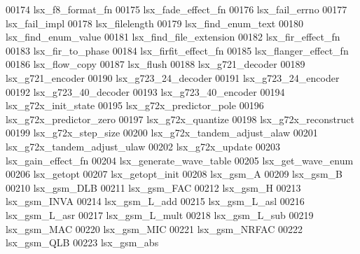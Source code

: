 \begin{DoxyCode}
00174 \textcolor{stringliteral}{lsx\_f8\_format\_fn}
00175 \textcolor{stringliteral}{lsx\_fade\_effect\_fn}
00176 \textcolor{stringliteral}{lsx\_fail\_errno}
00177 \textcolor{stringliteral}{lsx\_fail\_impl}
00178 \textcolor{stringliteral}{lsx\_filelength}
00179 \textcolor{stringliteral}{lsx\_find\_enum\_text}
00180 \textcolor{stringliteral}{lsx\_find\_enum\_value}
00181 \textcolor{stringliteral}{lsx\_find\_file\_extension}
00182 \textcolor{stringliteral}{lsx\_fir\_effect\_fn}
00183 \textcolor{stringliteral}{lsx\_fir\_to\_phase}
00184 \textcolor{stringliteral}{lsx\_firfit\_effect\_fn}
00185 \textcolor{stringliteral}{lsx\_flanger\_effect\_fn}
00186 \textcolor{stringliteral}{lsx\_flow\_copy}
00187 \textcolor{stringliteral}{lsx\_flush}
00188 \textcolor{stringliteral}{lsx\_g721\_decoder}
00189 \textcolor{stringliteral}{lsx\_g721\_encoder}
00190 \textcolor{stringliteral}{lsx\_g723\_24\_decoder}
00191 \textcolor{stringliteral}{lsx\_g723\_24\_encoder}
00192 \textcolor{stringliteral}{lsx\_g723\_40\_decoder}
00193 \textcolor{stringliteral}{lsx\_g723\_40\_encoder}
00194 \textcolor{stringliteral}{lsx\_g72x\_init\_state}
00195 \textcolor{stringliteral}{lsx\_g72x\_predictor\_pole}
00196 \textcolor{stringliteral}{lsx\_g72x\_predictor\_zero}
00197 \textcolor{stringliteral}{lsx\_g72x\_quantize}
00198 \textcolor{stringliteral}{lsx\_g72x\_reconstruct}
00199 \textcolor{stringliteral}{lsx\_g72x\_step\_size}
00200 \textcolor{stringliteral}{lsx\_g72x\_tandem\_adjust\_alaw}
00201 \textcolor{stringliteral}{lsx\_g72x\_tandem\_adjust\_ulaw}
00202 \textcolor{stringliteral}{lsx\_g72x\_update}
00203 \textcolor{stringliteral}{lsx\_gain\_effect\_fn}
00204 \textcolor{stringliteral}{lsx\_generate\_wave\_table}
00205 \textcolor{stringliteral}{lsx\_get\_wave\_enum}
00206 \textcolor{stringliteral}{lsx\_getopt}
00207 \textcolor{stringliteral}{lsx\_getopt\_init}
00208 \textcolor{stringliteral}{lsx\_gsm\_A}
00209 \textcolor{stringliteral}{lsx\_gsm\_B}
00210 \textcolor{stringliteral}{lsx\_gsm\_DLB}
00211 \textcolor{stringliteral}{lsx\_gsm\_FAC}
00212 \textcolor{stringliteral}{lsx\_gsm\_H}
00213 \textcolor{stringliteral}{lsx\_gsm\_INVA}
00214 \textcolor{stringliteral}{lsx\_gsm\_L\_add}
00215 \textcolor{stringliteral}{lsx\_gsm\_L\_asl}
00216 \textcolor{stringliteral}{lsx\_gsm\_L\_asr}
00217 \textcolor{stringliteral}{lsx\_gsm\_L\_mult}
00218 \textcolor{stringliteral}{lsx\_gsm\_L\_sub}
00219 \textcolor{stringliteral}{lsx\_gsm\_MAC}
00220 \textcolor{stringliteral}{lsx\_gsm\_MIC}
00221 \textcolor{stringliteral}{lsx\_gsm\_NRFAC}
00222 \textcolor{stringliteral}{lsx\_gsm\_QLB}
00223 \textcolor{stringliteral}{lsx\_gsm\_abs}

\end{DoxyCode}
